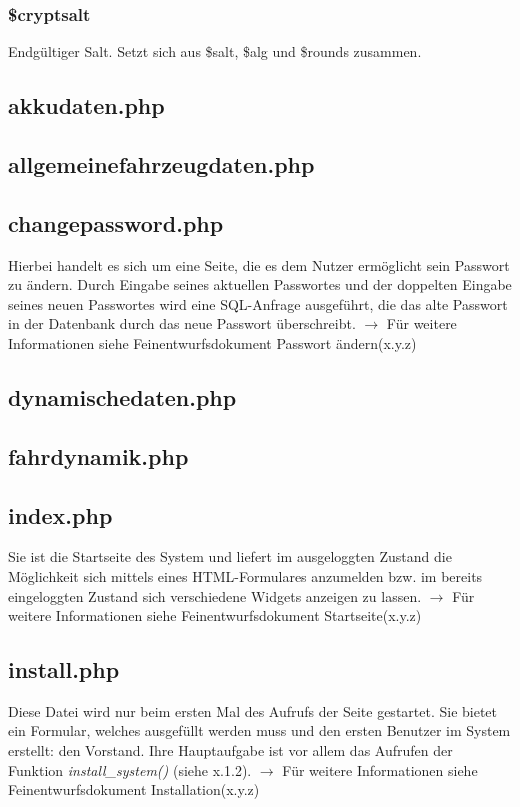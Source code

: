 \documentclass[fontsize = 12pt, paper = a4]{scrreprt}
\begin{document}
\subsubsection*{\$cryptsalt}
Endgültiger Salt. Setzt sich aus \$salt, \$alg und \$rounds zusammen.

\newpage
\subsection{akkudaten.php}

\subsection{allgemeinefahrzeugdaten.php}

\subsection{changepassword.php}
Hierbei handelt es sich um eine Seite, die es dem Nutzer ermöglicht sein Passwort zu ändern. Durch Eingabe seines aktuellen Passwortes und der doppelten Eingabe seines neuen Passwortes wird eine SQL-Anfrage ausgeführt, die das alte Passwort in der Datenbank durch das neue Passwort überschreibt.
$\rightarrow$ Für weitere Informationen siehe Feinentwurfsdokument \glqq Passwort ändern\grqq (x.y.z)

\subsection{dynamischedaten.php}

\subsection{fahrdynamik.php}

\subsection{index.php}
Sie ist die Startseite des System und liefert im ausgeloggten Zustand die Möglichkeit sich mittels eines HTML-Formulares anzumelden bzw. im bereits eingeloggten Zustand sich verschiedene Widgets anzeigen zu lassen.
$\rightarrow$ Für weitere Informationen siehe Feinentwurfsdokument \glqq Startseite\grqq (x.y.z)

\subsection{install.php}
Diese Datei wird nur beim ersten Mal des Aufrufs der Seite gestartet. Sie bietet ein Formular, welches ausgefüllt werden muss und den ersten Benutzer im System erstellt: den Vorstand. Ihre Hauptaufgabe ist vor allem das Aufrufen der Funktion \textit{install\_system()} (siehe x.1.2).
$\rightarrow$ Für weitere Informationen siehe Feinentwurfsdokument \glqq Installation\grqq (x.y.z)
\end{document}
